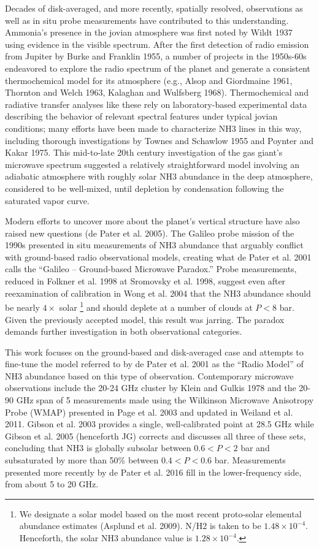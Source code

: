 \documentclass{article}
\newcommand{\e}[1]{\times 10^{#1}}
\begin{document}
	Decades of disk-averaged, and more recently, spatially resolved, observations as well as in situ probe measurements have contributed to this understanding.
	Ammonia's presence in the jovian atmosphere was first noted by Wildt 1937 using evidence in the visible spectrum.
	After the first detection of radio emission from Jupiter by Burke and Franklin 1955, a number of projects in the 1950s-60s endeavored to explore the radio spectrum of the planet and generate a consistent thermochemical model for its atmosphere (e.g., Alsop and Giordmaine 1961, Thornton and Welch 1963, Kalaghan and Wulfsberg 1968).
	Thermochemical and radiative transfer analyses like these rely on laboratory-based experimental data describing the behavior of relevant spectral features under typical jovian conditions; many efforts have been made to characterize NH3 lines in this way, including thorough investigations by Townes and Schawlow 1955 and Poynter and Kakar 1975.
	This mid-to-late 20th century investigation of the gas giant's microwave spectrum suggested a relatively straightforward model involving an adiabatic atmosphere with roughly solar NH3 abundance in the deep atmosphere, considered to be well-mixed, until depletion by condensation following the saturated vapor curve.

	Modern efforts to uncover more about the planet's vertical structure have also raised new questions (de Pater et al. 2005).
	The Galileo probe mission of the 1990s presented in situ measurements of NH3 abundance that arguably conflict with ground-based radio observational models, creating what de Pater et al. 2001 calls the ``Galileo -- Ground-based Microwave Paradox.''
	Probe measurements, reduced in Folkner et al. 1998 at Sromovsky et al. 1998, suggest even after reexamination of calibration in Wong et al. 2004 that the NH3 abundance should be nearly $4 \times$ solar
	\footnote{We designate a solar model based on the most recent proto-solar elemental abundance estimates (Asplund et al. 2009). N/H2 is taken to be $1.48 \e{-4}$. Henceforth, the solar NH3 abundance value is $1.28 \e{-4}$.}
	and should deplete at a number of clouds at $P<8$ bar.
	Given the previously accepted model, this result was jarring.
	The paradox demands further investigation in both observational categories.

	This work focuses on the ground-based and disk-averaged case and attempts to fine-tune the model referred to by de Pater et al. 2001 as the ``Radio Model'' of NH3 abundance based on this type of observation.
	Contemporary microwave observations include the 20-24 GHz cluster by Klein and Gulkis 1978 and the 20-90 GHz span of 5 measurements made using the Wilkinson Microwave Anisotropy Probe (WMAP) presented in Page et al. 2003 and updated in Weiland et al. 2011.
	Gibson et al. 2003 provides a single, well-calibrated point at 28.5 GHz while Gibson et al. 2005 (henceforth JG) corrects and discusses all three of these sets, concluding that NH3 is globally subsolar between $0.6 < P < 2$ bar and subsaturated by more than 50\% between $0.4 < P < 0.6$ bar.
	Measurements presented more recently by de Pater et al. 2016 fill in the lower-frequency side, from about 5 to 20 GHz.
\end{document}
